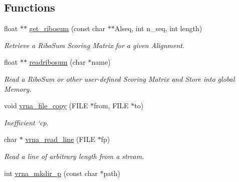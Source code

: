 \subsection*{Functions}
\begin{DoxyCompactItemize}
\item 
\mbox{\label{group__file__utils_ga1116aed4b2dab5252cd23946d47d52c3}} 
float $\ast$$\ast$ \hyperlink{group__file__utils_ga1116aed4b2dab5252cd23946d47d52c3}{get\+\_\+ribosum} (const char $\ast$$\ast$Alseq, int n\+\_\+seq, int length)
\begin{DoxyCompactList}\small\item\em Retrieve a Ribo\+Sum Scoring Matrix for a given Alignment. \end{DoxyCompactList}\item 
\mbox{\label{group__file__utils_ga5e125c9586fcd4e2e1559fe76f7289cc}} 
float $\ast$$\ast$ \hyperlink{group__file__utils_ga5e125c9586fcd4e2e1559fe76f7289cc}{readribosum} (char $\ast$name)
\begin{DoxyCompactList}\small\item\em Read a Ribo\+Sum or other user-\/defined Scoring Matrix and Store into global Memory. \end{DoxyCompactList}\item 
\mbox{\label{group__file__utils_ga4382a56d2fee9ed738364b99329edc7c}} 
void \hyperlink{group__file__utils_ga4382a56d2fee9ed738364b99329edc7c}{vrna\+\_\+file\+\_\+copy} (F\+I\+LE $\ast$from, F\+I\+LE $\ast$to)
\begin{DoxyCompactList}\small\item\em Inefficient `cp\textquotesingle{}. \end{DoxyCompactList}\item 
char $\ast$ \hyperlink{group__file__utils_gad16c270b70a77c753088b29de8a802dc}{vrna\+\_\+read\+\_\+line} (F\+I\+LE $\ast$fp)
\begin{DoxyCompactList}\small\item\em Read a line of arbitrary length from a stream. \end{DoxyCompactList}\item 
\mbox{\label{group__file__utils_gacfa44a974272a4d42c5d391cc780a0ec}} 
int \hyperlink{group__file__utils_gacfa44a974272a4d42c5d391cc780a0ec}{vrna\+\_\+mkdir\+\_\+p} (const char $\ast$path)
$$
\end{DoxyCompactItemize}
